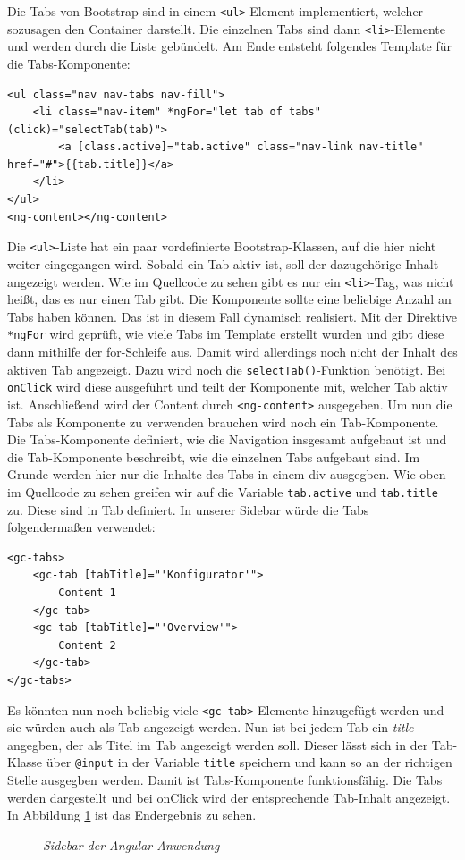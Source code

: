 Die Tabs von Bootstrap sind in einem \texttt{<ul>}-Element implementiert, welcher sozusagen den Container darstellt. Die einzelnen Tabs sind dann \texttt{<li>}-Elemente und werden durch die Liste gebündelt. Am Ende entsteht folgendes Template für die Tabs-Komponente:
%
\begin{lstlisting}
<ul class="nav nav-tabs nav-fill">
	<li class="nav-item" *ngFor="let tab of tabs" (click)="selectTab(tab)">
		<a [class.active]="tab.active" class="nav-link nav-title" href="#">{{tab.title}}</a>
	</li>
</ul>
<ng-content></ng-content>
\end{lstlisting}
%
Die \texttt{<ul>}-Liste hat ein paar vordefinierte Bootstrap-Klassen, auf die hier nicht weiter eingegangen wird. Sobald ein Tab aktiv ist, soll der dazugehörige Inhalt angezeigt werden. Wie im Quellcode zu sehen gibt es nur ein \texttt{<li>}-Tag, was nicht heißt, das es nur einen Tab gibt. Die Komponente sollte eine beliebige Anzahl an Tabs haben können. Das ist in diesem Fall dynamisch realisiert. Mit der Direktive \texttt{*ngFor} wird geprüft, wie viele Tabs im Template erstellt wurden und gibt diese dann mithilfe der for-Schleife aus. Damit wird allerdings noch nicht der Inhalt des aktiven Tab angezeigt. Dazu wird noch die \texttt{selectTab()}-Funktion benötigt. Bei \texttt{onClick} wird diese ausgeführt und teilt der Komponente mit, welcher Tab aktiv ist. Anschließend wird der Content durch \texttt{<ng-content>} ausgegeben. Um nun die Tabs als Komponente zu verwenden brauchen wird noch ein Tab-Komponente. Die Tabs-Komponente definiert, wie die Navigation insgesamt aufgebaut ist und die Tab-Komponente beschreibt, wie die einzelnen Tabs aufgebaut sind. Im Grunde werden hier nur die Inhalte des Tabs in einem div ausgegben. Wie oben im Quellcode zu sehen greifen wir auf die Variable \texttt{tab.active} und \texttt{tab.title} zu. Diese sind in Tab definiert. In unserer Sidebar würde die Tabs folgendermaßen verwendet:
%
\begin{lstlisting}
<gc-tabs>
	<gc-tab [tabTitle]="'Konfigurator'">
		Content 1
	</gc-tab>
	<gc-tab [tabTitle]="'Overview'">
		Content 2
	</gc-tab>
</gc-tabs>
\end{lstlisting}
%
Es könnten nun noch beliebig viele \texttt{<gc-tab>}-Elemente hinzugefügt werden und sie würden auch als Tab angezeigt werden. Nun ist bei jedem Tab ein \textit{title} angegben, der als Titel im Tab angezeigt werden soll. Dieser lässt sich in der Tab-Klasse über \texttt{@input} in der Variable \texttt{title} speichern und kann so an der richtigen Stelle ausgegben werden. Damit ist Tabs-Komponente funktionsfähig. Die Tabs werden dargestellt und bei onClick wird der entsprechende Tab-Inhalt angezeigt. In Abbildung \ref{fig:sidebar} ist das Endergebnis zu sehen.\\
\begin{figure}[h]
	\centering
	{}
	\caption[Sidebar des Konfigurators]{\textit{Sidebar der Angular-Anwendung}}
	\label{fig:sidebar}
\end{figure}


